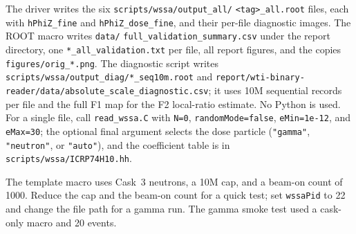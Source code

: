 \documentclass[11pt,a4paper]{article}
\begin{document}
\begin{sloppypar}
The driver writes the six \texttt{scripts/wssa/output\_all/}\allowbreak
\texttt{<tag>\_all.root} files, each with \texttt{hPhiZ\_fine} and
\texttt{hPhiZ\_dose\_fine}, and their per-file diagnostic images.  The ROOT
macro writes \texttt{data/}\allowbreak
\texttt{full\_validation\_summary.csv} under the report directory, one
\texttt{*\_all\_validation.txt} per file, all report figures, and the copies
\texttt{figures/orig\_*.png}.  The diagnostic script writes
\texttt{scripts/wssa/output\_diag/*\_seq10m.root} and
\texttt{report/wti-binary-reader/data/absolute\_scale\_diagnostic.csv}; it uses
10M sequential records per file and the full F1 map for the F2 local-ratio
estimate.  No Python is used.  For a single file, call
\texttt{read\_wssa.C} with \texttt{N=0}, \texttt{randomMode=false},
\texttt{eMin=1e-12}, and \texttt{eMax=30}; the optional final argument selects
the dose particle (\texttt{"gamma"}, \texttt{"neutron"}, or \texttt{"auto"}),
and the coefficient table is in \texttt{scripts/wssa/ICRP74H10.hh}.
\end{sloppypar}

The template macro uses Cask~3 neutrons, a 10M cap, and a beam-on count of
1000.  Reduce the cap and the beam-on count for a quick test; set
\texttt{wssaPid} to 22 and change the file path for a gamma run.  The gamma
smoke test used a cask-only macro and 20 events.
\end{document}
